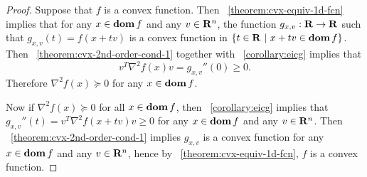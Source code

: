 \begin{proof}
Suppose that $f$ is a convex function.
Then \theoremname~\ref{theorem:cvx-equiv-1d-fcn} implies that
for any $x\in\mathop{\bf dom} f$ and any $v\in\mathbf{R}^n$,
the function $g_{x,v}:\mathbf{R}\to\mathbf{R}$ such that $g_{x,v}(t) = f(x+tv)$
is a convex function in $\{t\in\mathbf{R}~|~x+tv \in \mathop{\bf dom} f\}$.
Then \theoremname~\ref{theorem:cvx-2nd-order-cond-1} together with \corollaryname~\ref{corollary:eicg}
implies that
\[
v^T \nabla^2 f(x) v = g_{x,v}''(0) \geq0.
\]
Therefore $\nabla^2 f(x) \succeq 0$ for any $x \in \mathop{\bf dom} f$.

Now if $\nabla^2 f(x) \succeq 0$ for all $x\in\mathop{\bf dom} f$,
then
\corollaryname~\ref{corollary:eicg}
implies that
$g_{x,v}''(t) = v^T \nabla^2 f(x+tv) v \geq0$ for any $x \in \mathop{\bf dom} f$ and any $v\in\mathbf{R}^n$.
Then \theoremname~\ref{theorem:cvx-2nd-order-cond-1} implies
$g_{x,v}$ is a convex function for any $x \in \mathop{\bf dom} f$ and any $v\in\mathbf{R}^n$,
hence by \theoremname~\ref{theorem:cvx-equiv-1d-fcn},
$f$ is a convex function.
\end{proof}
